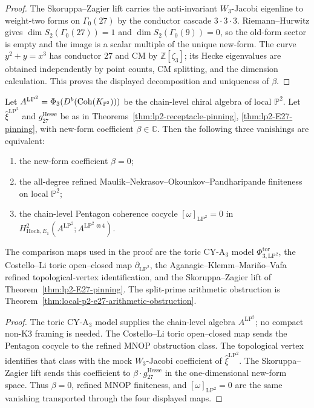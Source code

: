 \begin{proof}
The Skoruppa--Zagier lift carries the anti-invariant
$W_3$-Jacobi eigenline to weight-two forms on $\Gamma_0(27)$ by the
conductor cascade $3\cdot 3\cdot 3$. Riemann--Hurwitz gives
$\dim S_2(\Gamma_0(27))=1$ and $\dim S_2(\Gamma_0(9))=0$, so the
old-form sector is empty and the image is a scalar multiple of the
unique new-form. The curve $y^2+y=x^3$ has conductor $27$ and CM by
$\mathbb{Z}[\zeta_3]$; its Hecke eigenvalues are obtained independently
by point counts, CM splitting, and the dimension calculation. This proves the
displayed decomposition and uniqueness of $\beta$.
\end{proof}

\begin{theorem}
\label{thm:lp2-E27-pentagon-equivalence}
Let $A^{\mathrm{LP^2}} = \Phi_3(D^b(\mathrm{Coh}(K_{\mathbb{P}^2})))$ be the
chain-level chiral algebra of local $\mathbb{P}^2$. Let
$\widehat{\xi}^{\mathrm{LP^2}}$ and $g^{\mathrm{Hesse}}_{27}$ be as in
Theorems~\ref{thm:lp2-receptacle-pinning},
\ref{thm:lp2-E27-pinning}, with new-form coefficient
$\beta \in \mathbb{C}$. Then the following three vanishings are
equivalent:
\begin{enumerate}[label=\textup{(\roman*)}]
\item the new-form coefficient $\beta = 0$;
\item the all-degree refined Maulik--Nekrasov--Okounkov--Pandharipande
 finiteness on local $\mathbb{P}^2$;
\item the chain-level Pentagon coherence cocycle
 $[\omega]_{\mathrm{LP^2}} = 0$ in
 $H^2_{\mathrm{Hoch}, E_1}(A^{\mathrm{LP^2}};
 A^{\mathrm{LP^2}\,\otimes 4})$.
\end{enumerate}
The comparison maps used in the proof are the toric CY-A$_3$ model
$\Phi_{3,\mathrm{LP}^2}^{\mathrm{tor}}$, the Costello--Li toric
open--closed map $\partial_{\mathrm{LP}^2}$, the
Aganagic--Klemm--Mariño--Vafa refined topological-vertex
identification, and the Skoruppa--Zagier lift of
Theorem~\ref{thm:lp2-E27-pinning}. The split-prime arithmetic
obstruction is Theorem~\ref{thm:local-p2-e27-arithmetic-obstruction}.
\end{theorem}

\begin{proof}
The toric CY-A$_3$ model supplies the chain-level algebra
$A^{\mathrm{LP}^2}$; no compact non-K3 framing is needed. The
Costello--Li toric open--closed map sends the Pentagon cocycle to the
refined MNOP obstruction class. The topological vertex identifies that
class with the mock $W_3$-Jacobi coefficient of
$\widehat{\xi}^{\mathrm{LP}^2}$. The Skoruppa--Zagier lift sends this
coefficient to $\beta\cdot g^{\mathrm{Hesse}}_{27}$ in the
one-dimensional new-form space. Thus $\beta=0$, refined MNOP
finiteness, and $[\omega]_{\mathrm{LP}^2}=0$ are the same vanishing
transported through the four displayed maps.
\end{proof}

